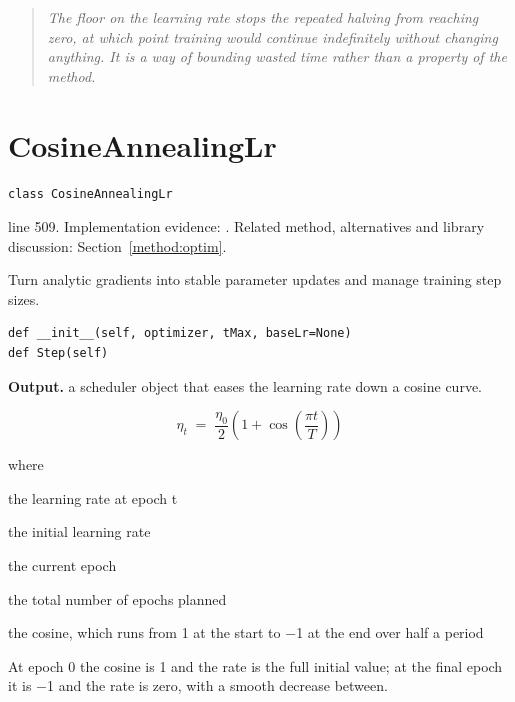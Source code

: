 \begin{quote}\small\itshape The floor on the learning rate stops the repeated halving from reaching zero, at which point training would continue indefinitely without changing anything. It is a way of bounding wasted time rather than a property of the method.\end{quote}


\section{CosineAnnealingLr}\label{fn:train:CosineAnnealingLr}
\begin{lstlisting}[style=sig]
class CosineAnnealingLr
\end{lstlisting}
 line 509. Implementation evidence: \cite{code2026}. Related method, alternatives and library discussion: Section~\ref{method:optim}.


Turn analytic gradients into stable parameter updates and manage training step sizes.


\begin{lstlisting}[style=plain]
def __init__(self, optimizer, tMax, baseLr=None)
def Step(self)
\end{lstlisting}


\noindent\textbf{Output.} a scheduler object that eases the learning rate down a cosine curve.



\begin{equation}
\eta_t \;=\; \frac{\eta_0}{2}\left(1 + \cos\!\left(\frac{\pi t}{T}\right)\right)
\end{equation}

\noindent where
\begin{description}[leftmargin=2.4em,style=nextline,font=\normalfont\ttfamily]\setlength\itemsep{1pt}
  \item[{$\eta_t$}] \normalfont the learning rate at epoch t
  \item[{$\eta_0$}] \normalfont the initial learning rate
  \item[{$t$}] \normalfont the current epoch
  \item[{$T$}] \normalfont the total number of epochs planned
  \item[{$\cos$}] \normalfont the cosine, which runs from 1 at the start to $-$1 at the end over half a period
\end{description}
At epoch 0 the cosine is 1 and the rate is the full initial value; at the final epoch it is $-$1 and the rate is zero, with a smooth decrease between.


